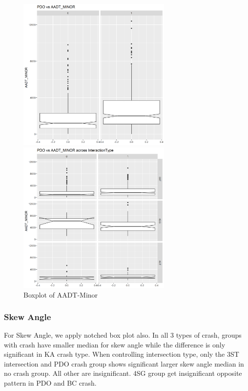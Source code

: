\documentclass[11pt]{scrartcl} %
\begin{document}
\begin{figure}[H]
\begin{minipage}[t]{0.5\linewidth}
\centering
\includegraphics[width=3in]{image/minor_all_pdo.png}
\small
\end{minipage}
\begin{minipage}[t]{0.5\linewidth}
\centering
\includegraphics[width=3in]{image/minor_pdo.png}
\small
\end{minipage}
\caption{Boxplot of AADT-Minor}
\end{figure}

\subsubsection{Skew Angle}

For Skew Angle, we apply notched box plot also. In all 3 types of crash, groups with crash have smaller median for skew angle while the difference is only significant in KA crash type. When controlling intersection type, only the 3ST intersection and PDO crash group shows significant larger skew angle median in no crash group. All other are insignificant. 4SG group get insignificant opposite pattern in PDO and BC crash.
\end{document}
